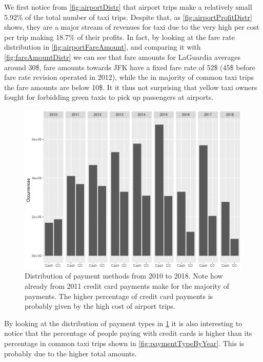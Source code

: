 \documentclass{acm_proc_article-sp-sigmod09}
\begin{document}
We first notice from \cref{fig:airportDistr} that airport trips make a relatively small 5.92\% of the total number of taxi trips. Despite that, as \cref{fig:airportProfitDistr} shows, they are a major stream of revenues for taxi due to the very high per cost per trip making 18.7\% of their profits. In fact, by looking at the fare rate distribution in \cref{fig:airportFareAmount}, and comparing it with \cref{fig:fareAmountDistr} we can see that fare amounts for LaGuardia averages around 30\$, fare amounts towards JFK have a fixed fare rate of 52\$ (45\$ before fare rate revision operated in 2012), while the in majority of common taxi trips the fare amounts are below 10\$. It it thus not surprising that yellow taxi owners fought for forbidding green taxis to pick up passengers at airports.

\begin{figure}
	\centering
	\includegraphics[width=1\columnwidth]{resources/airport/payment_type_distr.pdf}
	\caption{Distribution of payment methods from 2010 to 2018. Note how already from 2011 credit card payments make for the majority of payments. The higher percentage of credit card payments is probably given by the high cost of airport trips.}
	\label{fig:airportPaymentType}
\end{figure}

By looking at the distribution of payment types in \cref{fig:airportPaymentType} it is also interesting to notice that the percentage of people paying with credit cards is higher than its percentage in common taxi trips shown in \cref{fig:paymentTypeByYear}. This is probably due to the higher total amounts.
\end{document}
